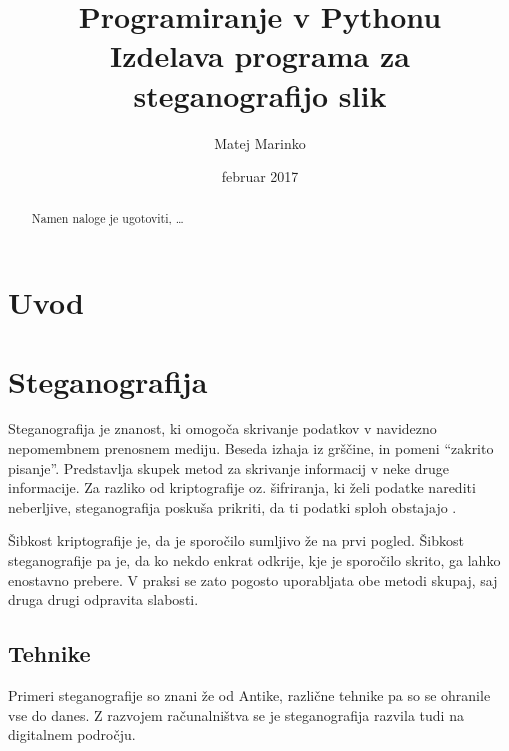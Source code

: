 \documentclass[a4paper, 12pt]{article}
\begin{document}
\title{
    Programiranje v Pythonu\\\large
    Izdelava programa za steganografijo slik}
\author{Matej Marinko}
\date{februar 2017}

\maketitle
\thispagestyle{empty}
\newpage

\tableofcontents
\newpage

\begin{abstract}
    Namen naloge je ugotoviti, \ldots
\end{abstract}


\section{Uvod} 

\newpage 
\section{Steganografija}
    Steganografija je znanost, ki omogoča skrivanje podatkov v navidezno nepomembnem prenosnem mediju. Beseda izhaja iz grščine, in pomeni ``zakrito pisanje''. Predstavlja skupek metod za skrivanje informacij v neke druge informacije. Za razliko od kriptografije oz. šifriranja, ki želi podatke narediti neberljive, steganografija poskuša prikriti, da ti podatki sploh obstajajo \cite{monitor}.

    Šibkost kriptografije je, da je sporočilo sumljivo že na prvi pogled. Šibkost steganografije pa je, da ko nekdo enkrat odkrije, kje je sporočilo skrito, ga lahko enostavno prebere. V praksi se zato pogosto uporabljata obe metodi skupaj, saj druga drugi odpravita slabosti.

    \subsection{Tehnike}
        Primeri steganografije so znani že od Antike, različne tehnike pa so se ohranile vse do danes. Z razvojem računalništva se je steganografija razvila tudi na digitalnem področju.\\
\end{document}
